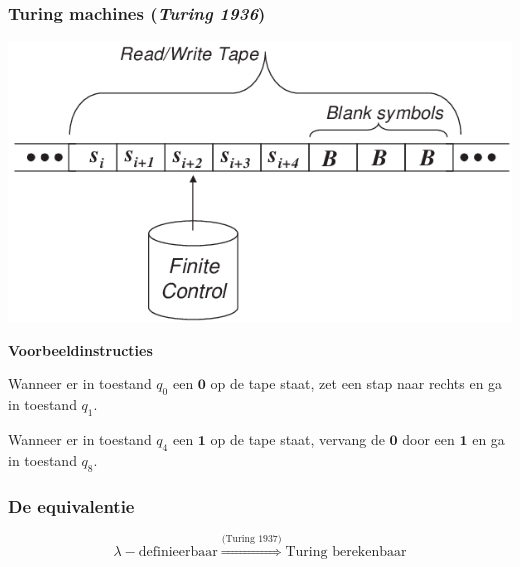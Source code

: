 \documentclass{beamer}
\begin{document}
\begin{frame}{}
    \frametitle{Turing machines (\emph{Turing 1936})}
    \begin{center}
        \includegraphics[height=0.3\textheight]{tm.png}
    \end{center}    
    \textbf{Voorbeeldinstructies}
    \begin{description}
        \item<2->[$q_0\mathbf{0}Rq_1$] Wanneer er in toestand $q_0$ een $\mathbf{0}$ op 
        de tape staat, zet een stap naar rechts en ga in toestand $q_1$.
        \item<3->[$q_4\mathbf{1}\mathbf{0}q_8$] Wanneer er in toestand $q_4$ een $\mathbf{1}$
        op de tape staat, vervang de $\mathbf{0}$ door een $\mathbf{1}$ en ga in toestand $q_8$.
    \end{description}
\end{frame}

\begin{frame}
    \frametitle{De equivalentie}

    $$\lambda-\text{definieerbaar} \stackrel{\scriptscriptstyle \text{(Turing 1937)}}{\Longrightarrow} \text{Turing berekenbaar}$$


\end{frame}
\end{document}
